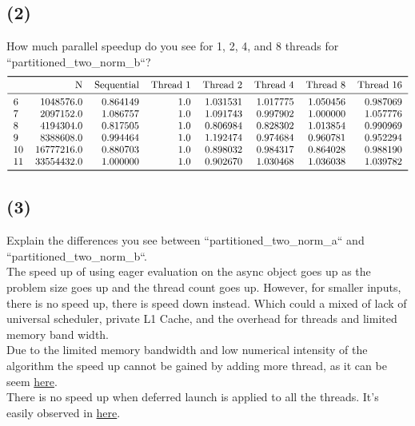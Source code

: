 \documentclass[]{article}
\begin{document}
    \subsection*{(2)}
        How much parallel speedup do you see for 1, 2, 4, and 8 threads for ``partitioned\_two\_norm\_b``? 
        $$
        \begin{tabular}{lrrrrrrr}
            \toprule
            {} &N &Sequential &Thread 1 &Thread 2 &Thread 4 &Thread 8 &Thread 16 \\
            \midrule
            6  &   1048576.0 &  0.864149 &  1.0 &  1.031531 &  1.017775 &  1.050456 &  0.987069 \\
            7  &   2097152.0 &  1.086757 &  1.0 &  1.091743 &  0.997902 &  1.000000 &  1.057776 \\
            8  &   4194304.0 &  0.817505 &  1.0 &  0.806984 &  0.828302 &  1.013854 &  0.990969 \\
            9  &   8388608.0 &  0.994464 &  1.0 &  1.192474 &  0.974684 &  0.960781 &  0.952294 \\
            10 &  16777216.0 &  0.880703 &  1.0 &  0.898032 &  0.984317 &  0.864028 &  0.988190 \\
            11 &  33554432.0 &  1.000000 &  1.0 &  0.902670 &  1.030468 &  1.036038 &  1.039782 \\
            \bottomrule
        \end{tabular}
            \label{tbl:fnorm.2}
        $$
       
    \subsection*{(3)}
        Explain the differences you see between ``partitioned\_two\_norm\_a`` and ``partitioned\_two\_norm\_b``.
        \\[1.1em]
        The speed up of using eager evaluation on the async object goes up as the problem size goes up and the thread count goes up. However, for smaller inputs, there is no speed up, there is speed down instead. Which could a mixed of lack of universal scheduler, private L1 Cache, and the overhead for threads and limited memory band width. 
        \\
        Due to the limited memory bandwidth and low numerical intensity of the algorithm the speed up cannot be gained by adding more thread, as it can be seem \hyperref[tbl:fnorm.1]{here}. 
        \\
        There is no speed up when deferred launch is applied to all the threads. It's easily observed in \hyperref[tbl:fnorm.2]{here}. 
\end{document}
